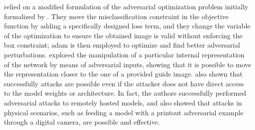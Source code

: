 \citet{carlini2016towards} relied on a modified formulation of the adversarial optimization problem initially formalized by \citet{szegedy2013intriguing}.
They move the misclassification constraint in the objective function by adding a specifically designed loss term, and they change the variable of the optimization to ensure the obtained image is valid without enforcing the box constraint;
\gls{adam} is then employed to optimize and find better adversarial perturbations.
\citet{sabour2015adversarial} explored the manipulation of a particular internal representation of the network by means of adversarial inputs, showing that it is possible to move the representation closer to the one of a provided guide image.
\citet{papernot2016practical} also shown that successfully attacks are possible even if the attacker does not have direct access to the model weights or architecture.
In fact, the authors successfully performed adversarial attacks to remotely hosted models, and \citet{kurakin2016adversarial} also showed that attacks in physical scenarios, such as feeding a model with a printout adversarial example through a digital camera, are possible and effective.

